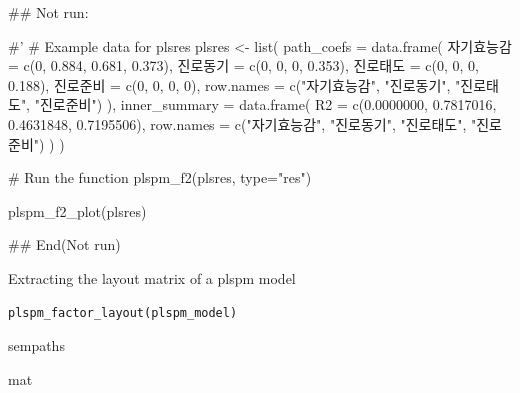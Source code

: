 \documentclass[a4paper]{book}
\begin{document}
\begin{Examples}
\begin{ExampleCode}
## Not run: 

#'
# Example data for plsres
plsres <- list(
  path_coefs = data.frame(
    자기효능감 = c(0, 0.884, 0.681, 0.373),
    진로동기 = c(0, 0, 0, 0.353),
    진로태도 = c(0, 0, 0, 0.188),
    진로준비 = c(0, 0, 0, 0),
    row.names = c("자기효능감", "진로동기", "진로태도", "진로준비")
  ),
  inner_summary = data.frame(
    R2 = c(0.0000000, 0.7817016, 0.4631848, 0.7195506),
    row.names = c("자기효능감", "진로동기", "진로태도", "진로준비")
  )
)

# Run the function
plspm_f2(plsres, type="res")



plspm_f2_plot(plsres)

## End(Not run)


\end{ExampleCode}
\end{Examples}
%
\begin{Description}
Extracting the layout matrix of a plspm model
\end{Description}
%
\begin{Usage}
\begin{verbatim}
plspm_factor_layout(plspm_model)
\end{verbatim}
\end{Usage}
%
\begin{Arguments}
\begin{ldescription}
\item[\code{plspm\_model}] sempaths
\end{ldescription}
\end{Arguments}
%
\begin{Value}
mat
\end{Value}
%
\end{document}
